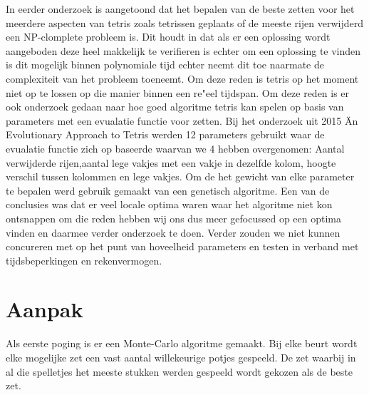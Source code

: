 \documentclass[10pt]{article}
\begin{document}
In eerder onderzoek is aangetoond dat het bepalen van de beste zetten voor het meerdere aspecten van tetris zoals tetrissen geplaats of de meeste rijen verwijderd een NP-clomplete probleem\cite{nphard} is. Dit houdt in dat als er een oplossing wordt aangeboden deze heel makkelijk te verifieren is echter om een oplossing te vinden is dit mogelijk binnen polynomiale tijd echter neemt dit toe naarmate de complexiteit van het probleem toeneemt. Om deze reden is tetris op het moment niet op te lossen op die manier binnen een re"{e}el tijdspan. Om deze reden is er ook onderzoek gedaan naar hoe goed algoritme tetris kan spelen op basis van parameters met een evualatie functie voor zetten. Bij het onderzoek uit 2015 \"An Evolutionary Approach to Tetris\" \cite{genetic} werden 12 parameters gebruikt waar de evualatie functie zich op baseerde waarvan we 4 hebben overgenomen: Aantal verwijderde rijen,aantal lege vakjes met een vakje in dezelfde kolom, hoogte verschil tussen kolommen en lege vakjes. Om de het gewicht van elke parameter te bepalen werd gebruik gemaakt van een genetisch algoritme. Een van de conclusies was dat er veel locale optima waren waar het algoritme niet kon ontsnappen om die reden hebben wij ons dus meer gefocussed op een optima vinden en daarmee verder onderzoek te doen. Verder zouden we niet kunnen concureren met op het punt van hoveelheid parameters en testen in verband met tijdsbeperkingen en rekenvermogen.

\section{Aanpak}

Als eerste poging is er een Monte-Carlo algoritme gemaakt. Bij elke beurt wordt elke mogelijke zet een vast aantal willekeurige potjes gespeeld. De zet waarbij in al die spelletjes het meeste stukken werden gespeeld wordt gekozen als de beste zet.
\end{document}
